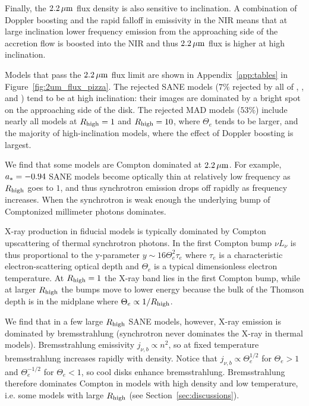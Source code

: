 Finally, the $2.2\,\mu\mathrm{m}$ flux density is also sensitive to inclination.  A combination of Doppler boosting and the rapid falloff in emissivity in the NIR means that at large inclination lower frequency emission from the approaching side of the accretion flow is boosted into the NIR and thus $2.2\,\mu\mathrm{m}$ flux is higher at high inclination.

Models that pass the $2.2\,\mu\mathrm{m}$ flux limit are shown in Appendix~\ref{app:tables} in Figure~\ref{fig:2um_flux_pizza}.
The rejected SANE models ($7\%$ rejected by all of \kharma, \bhac, and \hamr) tend to be at high inclination: their images are dominated by a bright spot on the approaching side of the disk.
The rejected MAD models ($53\%$) include nearly all models at $R_\mathrm{high} = 1$ and $R_\mathrm{high} = 10$, where $\Theta_e$ tends to be larger, and the majority of high-inclination models, where the effect of Doppler boosting is largest.

We find that some models are Compton dominated at $2.2\,\mu\mathrm{m}$.
For example, $a_* = -0.94$ SANE models become optically thin at relatively low frequency as $R_\mathrm{high}$ goes to $1$, and thus synchrotron emission drops off rapidly as frequency increases.  When the synchrotron is weak enough the underlying bump of Comptonized millimeter photons dominates.


X-ray production in fiducial models is typically dominated by Compton upscattering of thermal synchrotron photons.
In the first Compton bump $\nu L_\nu$ is thus proportional to the y-parameter $y \sim 16 \Theta_e^2 \tau_e$ where $\tau_e$ is a characteristic electron-scattering optical depth and $\Theta_e$ is a typical dimensionless electron temperature.
At $R_\mathrm{high} = 1$ the X-ray band lies in the first Compton bump, while at larger $R_\mathrm{high}$ the bumps move to lower energy because the bulk of the Thomson depth is in the midplane where $\Theta_e \propto 1/R_\mathrm{high}$.

We find that in a few large $R_\mathrm{high}$ SANE models, however, X-ray emission is dominated by bremsstrahlung (synchrotron never dominates the X-ray in thermal models).  Bremsstrahlung emissivity $j_{\nu,b} \propto n^2$, so at fixed temperature bremsstrahlung increases rapidly with density. Notice that $j_{\nu,b} \propto \Theta_e^{1/2}$ for $\Theta_e > 1$ and $\Theta_e^{-1/2}$ for $\Theta_e < 1$, so cool disks enhance bremsstrahlung.  Bremsstrahlung therefore dominates Compton in models with high density and low temperature, i.e. some models with large $R_\mathrm{high}$ (see Section~\ref{sec:discussions}).  

